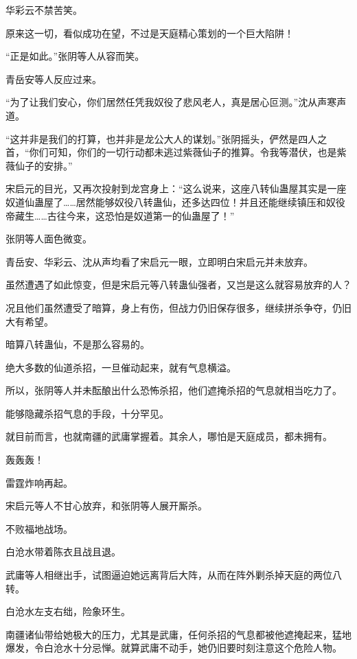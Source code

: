 
\begin{this_body}

华彩云不禁苦笑。

原来这一切，看似成功在望，不过是天庭精心策划的一个巨大陷阱！

“正是如此。”张阴等人从容而笑。

青岳安等人反应过来。

“为了让我们安心，你们居然任凭我奴役了悲风老人，真是居心叵测。”沈从声寒声道。

“这并非是我们的打算，也并非是龙公大人的谋划。”张阴摇头，俨然是四人之首，“你们可知，你们的一切行动都未逃过紫薇仙子的推算。令我等潜伏，也是紫薇仙子的安排。”

宋启元的目光，又再次投射到龙宫身上：“这么说来，这座八转仙蛊屋其实是一座奴道仙蛊屋了……居然能够奴役八转蛊仙，还多达四位！并且还能继续镇压和奴役帝藏生……古往今来，这恐怕是奴道第一的仙蛊屋了！”

张阴等人面色微变。

青岳安、华彩云、沈从声均看了宋启元一眼，立即明白宋启元并未放弃。

虽然遭遇了如此惊变，但是宋启元等八转蛊仙强者，又岂是这么就容易放弃的人？

况且他们虽然遭受了暗算，身上有伤，但战力仍旧保存很多，继续拼杀争夺，仍旧大有希望。

暗算八转蛊仙，不是那么容易的。

绝大多数的仙道杀招，一旦催动起来，就有气息横溢。

所以，张阴等人并未酝酿出什么恐怖杀招，他们遮掩杀招的气息就相当吃力了。

能够隐藏杀招气息的手段，十分罕见。

就目前而言，也就南疆的武庸掌握着。其余人，哪怕是天庭成员，都未拥有。

轰轰轰！

雷霆炸响再起。

宋启元等人不甘心放弃，和张阴等人展开厮杀。

不败福地战场。

白沧水带着陈衣且战且退。

武庸等人相继出手，试图逼迫她远离背后大阵，从而在阵外剿杀掉天庭的两位八转。

白沧水左支右绌，险象环生。

南疆诸仙带给她极大的压力，尤其是武庸，任何杀招的气息都被他遮掩起来，猛地爆发，令白沧水十分忌惮。就算武庸不动手，她仍旧要时刻注意这个危险人物。


\end{this_body}
